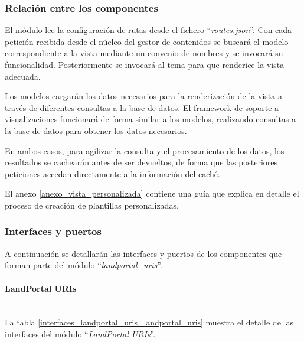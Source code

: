 \subsubsection{Relación entre los componentes}
El módulo lee la configuración de rutas desde el fichero ``\textit{routes.json}''.  Con cada petición recibida desde el núcleo del gestor de contenidos se buscará el modelo correspondiente a la vista mediante un convenio de nombres y se invocará su funcionalidad.  Posteriormente se invocará al tema para que renderice la vista adecuada.

Los modelos cargarán los datos necesarios para la renderización de la vista a través de diferentes consultas a la base de datos.  
El framework de soporte a visualizaciones funcionará de forma similar a los modelos, realizando consultas a la base de datos para obtener los datos necesarios.

En ambos casos, para agilizar la consulta y el procesamiento de los datos, los resultados se cachearán antes de ser devueltos, de forma que las posteriores peticiones accedan directamente a la información del caché.

El anexo \ref{anexo_vista_personalizada} contiene una guía que explica en detalle el proceso de creación de plantillas personalizadas.


\subsubsection{Interfaces y puertos}
A continuación se detallarán las interfaces y puertos de los componentes que forman parte del módulo ``\textit{landportal\_uris}''.

\paragraph{LandPortal URIs} \hfill \\
La tabla \ref{interfaces_landportal_uris_landportal_uris} muestra el detalle de las interfaces del módulo ``\textit{LandPortal URIs}''.  

